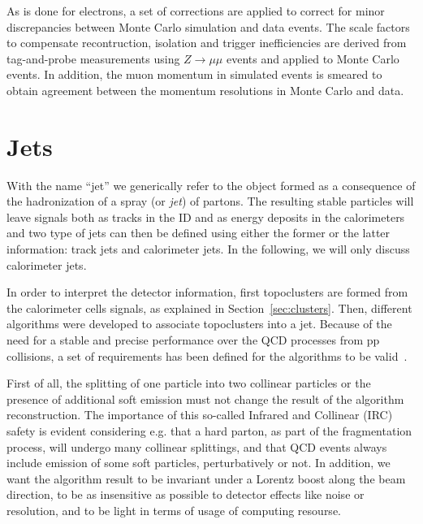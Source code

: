 As is done for electrons, a set of corrections are applied to correct for minor
discrepancies between Monte Carlo simulation and data events.
The scale factors to compensate recontruction, isolation and trigger 
inefficiencies are derived from tag-and-probe measurements using $Z\to \mu\mu$ events
and applied to Monte Carlo events. In addition, the muon momentum
in simulated events is smeared to obtain agreement between the momentum
resolutions in Monte Carlo and data.


\myskip
\section{Jets}\label{sec:jets}

With the name ``jet'' we generically refer to the object formed as a consequence
of the hadronization of a spray (or {\it jet}) of partons. The resulting stable particles
will leave signals both as tracks in the ID and as energy deposits in the calorimeters
and two type of jets can then be defined using either the former or the latter information:
track jets and calorimeter jets. In the following, we will only discuss calorimeter jets.

In order to interpret the detector information, first topoclusters are formed from the
calorimeter cells signals, as explained in Section~\ref{sec:clusters}. Then, different
algorithms were developed to associate topoclusters into a jet. Because of the
need for a stable and precise performance over the QCD processes from pp collisions,
a set of requirements has been defined for the algorithms to be valid~\cite{Salam:2009jx}.

First of all, the splitting of one particle into two collinear particles 
or the presence of additional soft emission must not change the 
result of the algorithm reconstruction.
The importance of this so-called Infrared and Collinear (IRC) safety is evident considering e.g. 
that a hard parton, as part of the fragmentation process, will undergo many collinear splittings,
and that QCD events always include emission of some soft particles, perturbatively or not.
In addition, we want the algorithm result to be invariant under a Lorentz boost along the beam direction,
to be as insensitive as possible to detector effects like noise or resolution, and to be light in terms
of  usage of computing resourse.

